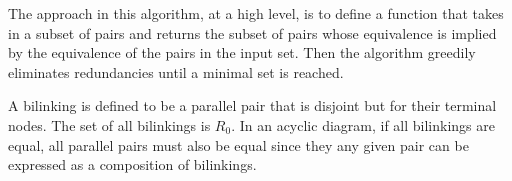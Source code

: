 \documentclass[sigplan,review,anonymous]{acmart}
\begin{document}
    


The approach in this algorithm, at a high level, is to define a function that takes in a subset of pairs and returns the subset of pairs whose equivalence is implied by the equivalence of the pairs in the input set.
Then the algorithm greedily eliminates redundancies until a minimal set is reached.

A bilinking is defined to be a parallel pair that is disjoint but for their terminal nodes. The set of all bilinkings is $R_0$.
In an acyclic diagram, if all bilinkings are equal, all parallel pairs must also be equal since they any given pair can be expressed as a composition of bilinkings.
\end{document}
